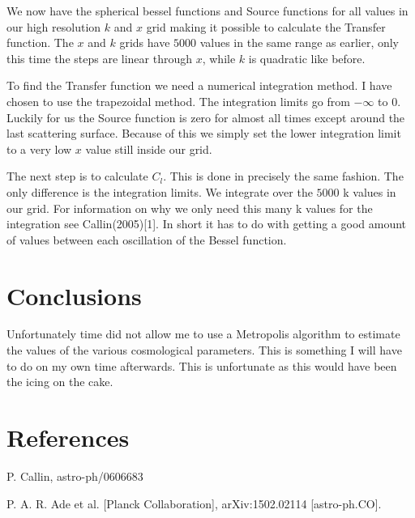 \documentclass[a4paper]{report}
\begin{document}
We now have the spherical bessel functions and Source functions for all values in our high resolution $k$ and $x$ grid making it possible to calculate the Transfer function. The $x$ and $k$ grids have $5000$ values in the same range as earlier, only this time the steps are linear through $x$, while $k$ is quadratic like before.

To find the Transfer function we need a numerical integration method. I have chosen to use the trapezoidal method. The integration limits go from $-\infty$ to $0$. Luckily for us the Source function is zero for almost all times except around the last scattering surface. Because of this we simply set the lower integration limit to a very low $x$ value still inside our grid.

The next step is to calculate $C_l$. This is done in precisely the same fashion. The only difference is the integration limits. We integrate over the $5000$ k values in our grid. For information on why we only need this many k values for the integration see Callin(2005)[1]. In short it has to do with getting a good amount of values between each oscillation of the  Bessel function. 



\section{Conclusions}\label{sec:Conc}
Unfortunately time did not allow me to use a Metropolis algorithm to estimate the values of the various cosmological parameters. This is something I will have to do on my own time afterwards. This is unfortunate as this would have been the icing on the cake.


\section{References}
\begin{enumerate}[label= {[}\arabic*{]} ]
 \item P. Callin, astro-ph/0606683
 \item P. A. R. Ade et al. [Planck Collaboration], arXiv:1502.02114 [astro-ph.CO].
 
\end{enumerate}
\end{document}
